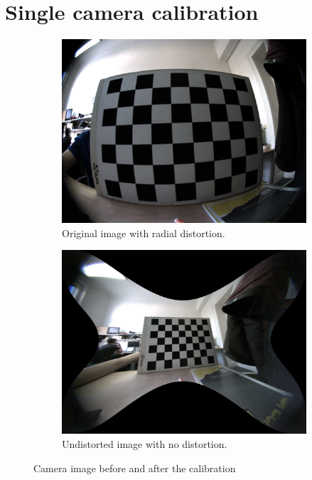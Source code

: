 \section{Single camera calibration}
\label{sec:meth_calib}
\begin{figure}[h]
    \begin{subfigure}[b]{0.45\textwidth}
      \includegraphics[width=\textwidth]{graphics/chessboard_img.png}
      \caption{Original image with radial distortion.}
      \label{fig:chb1}
    \end{subfigure}
    \hfill
    \begin{subfigure}[b]{0.45\textwidth}
      \includegraphics[width=\textwidth]{graphics/chessboard_img_rect.png}
      \caption{Undistorted image with no distortion.}
      \label{fig:chb2}
    \end{subfigure}
    \caption{Camera image before and after the calibration}
    \label{fig:chb}
\end{figure}

